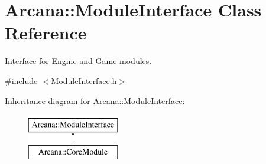 \hypertarget{class_arcana_1_1_module_interface}{}\section{Arcana\+:\+:Module\+Interface Class Reference}
\label{class_arcana_1_1_module_interface}


Interface for Engine and Game modules.  




{\ttfamily \#include $<$Module\+Interface.\+h$>$}

Inheritance diagram for Arcana\+:\+:Module\+Interface\+:\begin{figure}[H]
\begin{center}
\leavevmode
\includegraphics[height=2.000000cm]{class_arcana_1_1_module_interface}
\end{center}
\end{figure}
